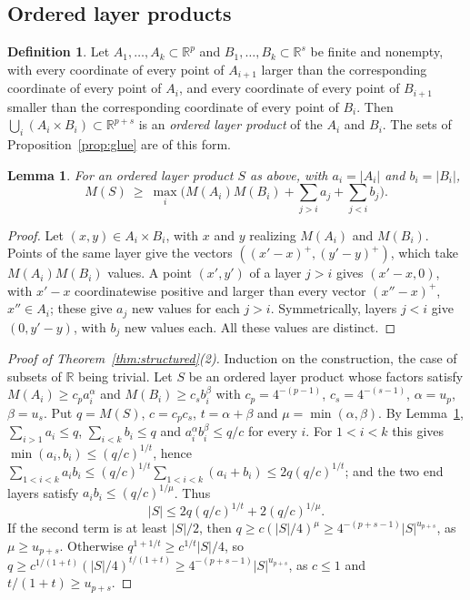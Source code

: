 \documentclass[11pt]{amsart}
\newtheorem{lemma}[theorem]{Lemma}
\theoremstyle{definition}
\newtheorem{definition}[theorem]{Definition}
\theoremstyle{remark}
\newcommand{\R}{\mathbb{R}}
\newcommand{\Mf}{M}
\begin{document}
\subsection*{Ordered layer products}

\begin{definition}\label{def:layers}
Let $A_1,\dots,A_k\subset\R^p$ and $B_1,\dots,B_k\subset\R^s$ be finite and nonempty, with every coordinate of every point of $A_{i+1}$ larger than the corresponding coordinate of every point of $A_i$, and every coordinate of every point of $B_{i+1}$ smaller than the corresponding coordinate of every point of $B_i$. Then $\bigcup_i(A_i\times B_i)\subset\R^{p+s}$ is an \emph{ordered layer product} of the $A_i$ and $B_i$. The sets of Proposition~\ref{prop:glue} are of this form.
\end{definition}

\begin{lemma}\label{lem:layerfan}
For an ordered layer product $S$ as above, with $a_i=|A_i|$ and $b_i=|B_i|$,
\[
\Mf(S)\ \ge\ \max_i\Big(\Mf(A_i)\Mf(B_i)+\sum_{j>i}a_j+\sum_{j<i}b_j\Big).
\]
\end{lemma}

\begin{proof}
Let $(x,y)\in A_i\times B_i$, with $x$ and $y$ realizing $\Mf(A_i)$ and $\Mf(B_i)$. Points of the same layer give the vectors $((x'-x)^+,(y'-y)^+)$, which take $\Mf(A_i)\Mf(B_i)$ values. A point $(x',y')$ of a layer $j>i$ gives $(x'-x,0)$, with $x'-x$ coordinatewise positive and larger than every vector $(x''-x)^+$, $x''\in A_i$; these give $a_j$ new values for each $j>i$. Symmetrically, layers $j<i$ give $(0,y'-y)$, with $b_j$ new values each. All these values are distinct.
\end{proof}

\begin{proof}[Proof of Theorem~\ref{thm:structured}(2)]
Induction on the construction, the case of subsets of $\R$ being trivial. Let $S$ be an ordered layer product whose factors satisfy $\Mf(A_i)\ge c_pa_i^{\alpha}$ and $\Mf(B_i)\ge c_sb_i^{\beta}$ with $c_p=4^{-(p-1)}$, $c_s=4^{-(s-1)}$, $\alpha=u_p$, $\beta=u_s$. Put $q=\Mf(S)$, $c=c_pc_s$, $t=\alpha+\beta$ and $\mu=\min(\alpha,\beta)$. By Lemma~\ref{lem:layerfan}, $\sum_{i>1}a_i\le q$, $\sum_{i<k}b_i\le q$ and $a_i^\alpha b_i^\beta\le q/c$ for every $i$. For $1<i<k$ this gives $\min(a_i,b_i)\le(q/c)^{1/t}$, hence $\sum_{1<i<k}a_ib_i\le(q/c)^{1/t}\sum_{1<i<k}(a_i+b_i)\le2q(q/c)^{1/t}$; and the two end layers satisfy $a_ib_i\le(q/c)^{1/\mu}$. Thus
\[
|S|\le2q(q/c)^{1/t}+2(q/c)^{1/\mu}.
\]
If the second term is at least $|S|/2$, then $q\ge c(|S|/4)^{\mu}\ge 4^{-(p+s-1)}|S|^{u_{p+s}}$, as $\mu\ge u_{p+s}$. Otherwise $q^{1+1/t}\ge c^{1/t}|S|/4$, so $q\ge c^{1/(1+t)}(|S|/4)^{t/(1+t)}\ge4^{-(p+s-1)}|S|^{u_{p+s}}$, as $c\le1$ and $t/(1+t)\ge u_{p+s}$.
\end{proof}
\end{document}
